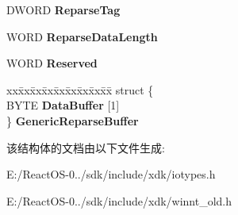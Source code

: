 \begin{DoxyCompactItemize}
\begin{tabbing}
\end{tabbing}\item 
\mbox{\label{struct___r_e_p_a_r_s_e___g_u_i_d___d_a_t_a___b_u_f_f_e_r_ac42c87e22cc452fae8051479751380d9}} 
D\+W\+O\+RD {\bfseries Reparse\+Tag}
\item 
\mbox{\label{struct___r_e_p_a_r_s_e___g_u_i_d___d_a_t_a___b_u_f_f_e_r_a81571dcda444e9ee717088d02439c341}} 
W\+O\+RD {\bfseries Reparse\+Data\+Length}
\item 
\mbox{\label{struct___r_e_p_a_r_s_e___g_u_i_d___d_a_t_a___b_u_f_f_e_r_ab81275fc85303389ef7e1691bcd3a859}} 
W\+O\+RD {\bfseries Reserved}
\item 
\mbox{\label{struct___r_e_p_a_r_s_e___g_u_i_d___d_a_t_a___b_u_f_f_e_r_a3375c4b34ef7303baab17183e4458b2a}} 
\begin{tabbing}
xx\=xx\=xx\=xx\=xx\=xx\=xx\=xx\=xx\=\kill
struct \{\\
\>BYTE {\bfseries DataBuffer} \mbox{[}1\mbox{]}\\
\} {\bfseries GenericReparseBuffer}\\

\end{tabbing}\end{DoxyCompactItemize}


该结构体的文档由以下文件生成\+:\begin{DoxyCompactItemize}
\item 
E\+:/\+React\+O\+S-\/0../sdk/include/xdk/iotypes.\+h\item 
E\+:/\+React\+O\+S-\/0../sdk/include/xdk/winnt\+\_\+old.\+h\end{DoxyCompactItemize}
